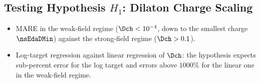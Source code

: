 \subsection{Testing Hypothesis \texorpdfstring{$H_1$}{H1}: Dilaton Charge Scaling}
\label{sec:h1}

\begin{itemize}
  \item MARE in the weak-field regime ($\Dch < 10^{-4}$, down to the smallest charge $\nsEdaDMin$) against the strong-field regime ($\Dch > 0.1$).
  \item Log-target regression against linear regression of $\Dch$: the hypothesis expects sub-percent error for the log target and errors above $1000\%$ for the linear one in the weak-field regime.
\end{itemize}
